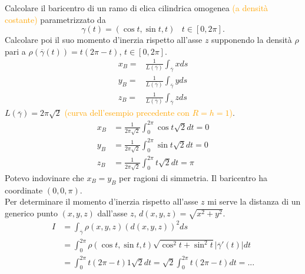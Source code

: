 \begin{exbar}
\begin{example}
	Calcolare il baricentro di un ramo di elica cilindrica omogenea \textcolor{orange}{(a densità costante)} parametrizzato da 
	\begin{equation*}
		\gamma (t)=(\cos t , \sin t , t)\,\,\,\,\, t \in [0, 2 \pi].
	\end{equation*}
	Calcolare poi il suo momento d'inerzia rispetto all'asse $z$ supponendo la densità $\rho $ pari a $\rho(\overline{\gamma}(t))=t(2\pi-t)$, $t\in [0,2\pi]$.
	\begin{align*}
		x_B=& \frac{1}{L(\overline{\gamma})}\int_{\overline{\gamma}}x ds\\
		y_B=& \frac{1}{L(\overline{\gamma})}\int_{\overline{\gamma}}y ds\\
		z_B=& \frac{1}{L(\overline{\gamma})}\int_{\overline{\gamma}}z ds
	\end{align*}
	$L(\overline{\gamma})=2\pi \sqrt{2}$ \textcolor{orange}{(curva dell'esempio precedente con $R=h=1$)}.
	\begin{align*}
		x_B&=\frac{1}{2\pi \sqrt{2}}\int_0^{2\pi}\cos t \sqrt{2} dt =0\\
		y_B&=\frac{1}{2\pi \sqrt{2}}\int_0^{2\pi}\sin t \sqrt{2} dt =0 \\
		z_B&= \frac{1}{2\pi \sqrt{2}}\int_0^{2\pi}t \sqrt{2}dt=\pi
	\end{align*}
	Potevo indovinare che $x_B=y_B$ per ragioni di simmetria. Il baricentro ha coordinate $(0,0,\pi)$.\\
	Per determinare il momento d'inerzia rispetto all'asse $z$ mi serve la distanza di un generico punto $(x,y,z)$ dall'asse $z$, $d(x,y,z)=\sqrt{x^2+y^2}$.
	\begin{align*}
		I&=\int_{\overline{\gamma}}\rho(x,y,z)(d(x,y,z))^2 ds\\
		&= \int_0^{2\pi} \rho(\cos t , \sin t , t)\sqrt{\cos^2 t +\sin ^2 t}|\overline{\gamma}'(t)|dt\\
		&= \int_0^{2\pi}t(2\pi -t )1 \sqrt{2}dt = \sqrt{2}\int_0^{2\pi} t(2\pi -t)dt=...
	\end{align*}
\end{example}
\end{exbar}



